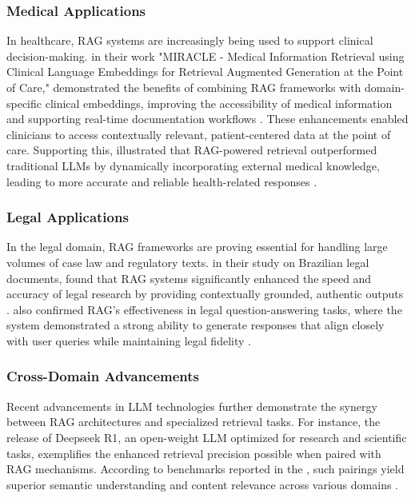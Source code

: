 \begin{refsection}
\subsubsection{Medical Applications}
\hspace{0.4cm}In healthcare, RAG systems are increasingly being used to support clinical decision-making. \citeauthor{arzideh2024miracle} \citeyear{arzideh2024miracle} in their work "MIRACLE - Medical Information Retrieval using Clinical Language Embeddings for Retrieval Augmented Generation at the Point of Care," demonstrated the benefits of combining RAG frameworks with domain-specific clinical embeddings, improving the accessibility of medical information and supporting real-time documentation workflows \cite{arzideh2024miracle}. These enhancements enabled clinicians to access contextually relevant, patient-centered data at the point of care. Supporting this, \citeauthor{amugongo2024retrieval} \citeyear{amugongo2024retrieval} illustrated that RAG-powered retrieval outperformed traditional LLMs by dynamically incorporating external medical knowledge, leading to more accurate and reliable health-related responses \cite{amugongo2024retrieval}.


\subsubsection{Legal Applications}
\hspace{0.4cm}In the legal domain, RAG frameworks are proving essential for handling large volumes of case law and regulatory texts. \citeauthor{aquino2024extracting} \citeyear{aquino2024extracting} in their study on Brazilian legal documents, found that RAG systems significantly enhanced the speed and accuracy of legal research by providing contextually grounded, authentic outputs \cite{aquino2024extracting}.  \citeauthor{ryu2023retrieval}  \citeyear{ryu2023retrieval} also confirmed RAG’s effectiveness in legal question-answering tasks, where the system demonstrated a strong ability to generate responses that align closely with user queries while maintaining legal fidelity \cite{ryu2023retrieval}.


\subsubsection{Cross-Domain Advancements}
\hspace{0.4cm}Recent advancements in LLM technologies further demonstrate the synergy between RAG architectures and specialized retrieval tasks. For instance, the release of Deepseek R1, an open-weight LLM optimized for research and scientific tasks, exemplifies the enhanced retrieval precision possible when paired with RAG mechanisms. According to benchmarks reported in the  \citeauthor{opencompass2024}  \citeyear{opencompass2024}, such pairings yield superior semantic understanding and content relevance across various domains \cite{opencompass2024}.




\end{refsection}
